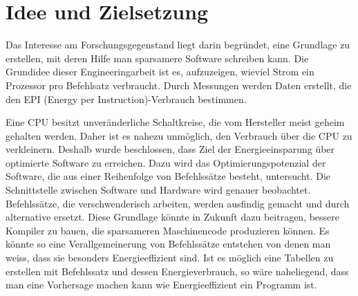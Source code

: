 \chapter{Idee und Zielsetzung}



Das Interesse am Forschungsgegenstand liegt darin begründet, eine Grundlage zu erstellen, mit deren Hilfe man sparsamere Software schreiben kann. Die Grundidee dieser Engineeringarbeit ist es, aufzuzeigen, wieviel Strom ein Prozessor pro Befehlsatz verbraucht. Durch Messungen werden Daten erstellt, die den EPI (Energy per Instruction)-Verbrauch bestimmen.
\par 
Eine CPU besitzt unveränderliche Schaltkreise, die vom Hersteller meist geheim gehalten werden. Daher ist es nahezu unmöglich, den Verbrauch über die CPU zu verkleinern. Deshalb wurde beschlossen, dass Ziel der Energieeinsparung über optimierte Software zu erreichen. Dazu wird das Optimierungspotenzial der Software, die aus einer Reihenfolge von Befehlssätze besteht, untersucht. Die Schnittstelle zwischen Software und Hardware wird genauer beobachtet. Befehlssätze, die verschwenderisch arbeiten, werden ausfindig gemacht und durch alternative ersetzt. Diese Grundlage könnte in Zukunft dazu beitragen, bessere Kompiler zu bauen, die sparsameren Maschinencode produzieren können. Es könnte so eine Verallgemeinerung von Befehlssätze entstehen von denen man weiss, dass sie besonders Energieeffizient sind. Ist es möglich eine Tabellen zu erstellen mit Befehlssatz und dessen Energieverbrauch, so wäre naheliegend, dass man eine Vorhersage machen kann wie Energieeffizient ein Programm ist.  
\par
